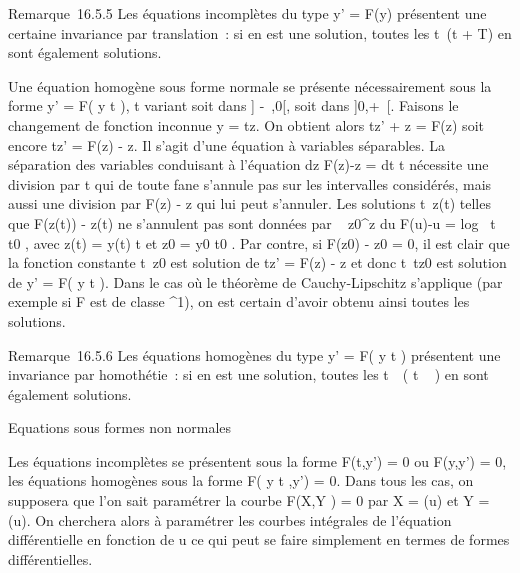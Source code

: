 Remarque~16.5.5 Les équations incomplètes du type y' = F(y) présentent
une certaine invariance par translation~: si \phi en est une solution,
toutes les t\mapsto~\phi(t + T) en sont également
solutions.

Une équation homogène sous forme normale se présente nécessairement sous
la forme y' = F( y \over t ), t variant soit dans {]}
-\infty~,0{[}, soit dans {]}0,+\infty~{[}. Faisons le changement de fonction
inconnue y = tz. On obtient alors tz' + z = F(z) soit encore tz' = F(z)
- z. Il s'agit d'une équation à variables séparables. La séparation des
variables conduisant à l'équation  dz \over F(z)-z
= dt \over t nécessite une division par t qui de
toute fa\ccon ne s'annule pas sur les intervalles
considérés, mais aussi une division par F(z) - z qui lui peut s'annuler.
Les solutions t\mapsto~z(t) telles que F(z(t)) -
z(t) ne s'annulent pas sont données par \int ~
z0^z du \over F(u)-u
= log~ \left \textbar{} t
\over t0 \right \textbar{},
avec z(t) = y(t) \over t et z0 =
y0 \over t0 . Par contre, si
F(z0) - z0 = 0, il est clair que la fonction
constante t\mapsto~z0 est solution de tz'
= F(z) - z et donc t\mapsto~tz0 est
solution de y' = F( y \over t ). Dans le cas où le
théorème de Cauchy-Lipschitz s'applique (par exemple si F est de classe
^1), on est certain d'avoir obtenu ainsi toutes les
solutions.

Remarque~16.5.6 Les équations homogènes du type y' = F( y
\over t ) présentent une invariance par homothétie~: si
\phi en est une solution, toutes les
t\mapsto~\lambda~\phi\left ( t
\over \lambda~ \right ) en sont également
solutions.

Equations sous formes non normales

Les équations incomplètes se présentent sous la forme F(t,y') = 0 ou
F(y,y') = 0, les équations homogènes sous la forme F( y
\over t ,y') = 0. Dans tous les cas, on supposera que
l'on sait paramétrer la courbe F(X,Y ) = 0 par X = \phi(u) et Y = \psi(u). On
cherchera alors à paramétrer les courbes intégrales de l'équation
différentielle en fonction de u ce qui peut se faire simplement en
termes de formes différentielles.

